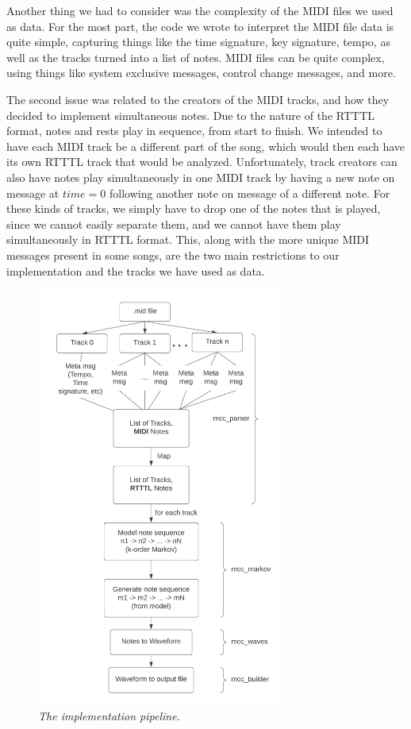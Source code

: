 \documentclass{article}
\begin{document}
Another thing we had to consider was the complexity of the MIDI files we used as data. For the most part, the code we wrote to interpret the MIDI file data is quite simple, 
capturing things like the time signature, key signature, tempo, as well as the tracks turned into a list of notes. MIDI files can be quite complex, using things like 
system exclusive messages, control change messages, and more. 

The second issue was related to the creators of the MIDI tracks, and how they decided to implement simultaneous notes. Due to the nature of the RTTTL format, notes and rests 
play in sequence, from start to finish. We intended to have each MIDI track be a different part of the song, which would then each have its own RTTTL track that would be 
analyzed. Unfortunately, track creators can also have notes play simultaneously in one MIDI track by having a new note on message at $time = 0$ following another note on message 
of a different note. For these kinds of tracks, we simply have to drop one of the notes that is played, since we cannot easily separate them, and we cannot have them play 
simultaneously in RTTTL format. This, along with the more unique MIDI messages present in some songs, are the two main restrictions to our implementation and the tracks we 
have used as data. \\


\begin{figure} 
\includegraphics[width=230pt]{figs/roadmap.png} 
\caption{\small \sl The implementation pipeline.\label{fig:roadmap}} 
\end{figure} 
\end{document}
